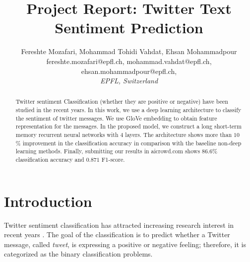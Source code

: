 \documentclass[8pt,conference,compsocconf]{IEEEtran}
\begin{document}
\title{Project Report: Twitter Text Sentiment Prediction}

\author{
 Fereshte Mozafari, Mohammad Tohidi Vahdat, Ehsan Mohammadpour\\
 fereshte.mozafari@epfl.ch, mohammad.vahdat@epfl.ch, ehsan.mohammadpour@epfl.ch, \\
  \textit{EPFL, Switzerland}
}

\maketitle
\begin{abstract}
	Twitter sentiment Classification (whether they are positive or negative) have been studied in the recent years.
	In this work, we use a deep learning architecture to classify the sentiment of twitter messages. We use GloVe embedding to obtain feature representation for the messages. In the proposed model, we construct a long short-term memory recurrent neural networks with $4$ layers. The architecture shows more than $10$\% improvement in the classification accuracy in comparison with the baseline non-deep learning methods. Finally, submitting our results in aicrowd.com shows $86.6$\% classification accuracy and $0.871$ F1-score.
\end{abstract}

\section{Introduction}
Twitter sentiment classification has attracted increasing research interest in recent years \cite{8700266,8924403}. The goal of the classification is to predict whether a Twitter message, called \textit{tweet}, is expressing a positive or negative feeling; therefore, it is categorized as the binary classification problems.
\end{document}
